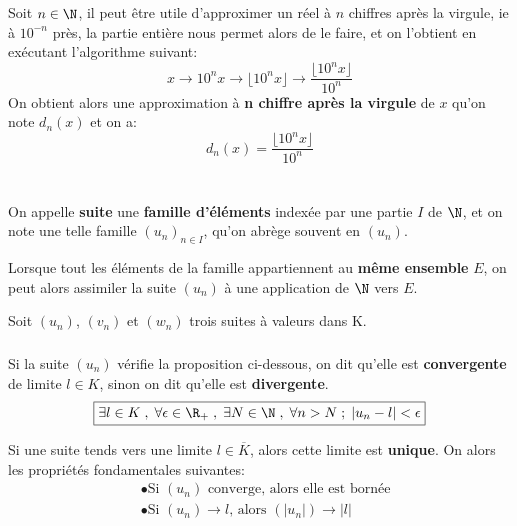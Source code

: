 \subsection*{}
Soit \(n \in \N\), il peut être utile d'approximer un réel à \(n\) chiffres après la virgule, ie à \(10^{-n}\) près, la partie entière nous permet alors de le faire, et on l'obtient en exécutant l'algorithme suivant:
\[
    x \rightarrow 10^n x \rightarrow \lfloor 10^n x \rfloor \rightarrow \frac{\lfloor 10^n x \rfloor}{10^n}
\]
On obtient alors une approximation à \textbf{n chiffre après la virgule} de \(x\) qu'on note \(d_n(x)\) et on a:
\[
    \boxed{
        d_n(x) = \frac{\lfloor 10^n x \rfloor}{10^n}
    }
\]

\chapter*{}
On appelle \textbf{suite} une \textbf{famille d'éléments} indexée par une partie \(I\) de \(\N\), et on note une telle famille \((u_n)_{n \in I}\), qu'on abrège souvent en \((u_n)\).\<

Lorsque tout les éléments de la famille appartiennent au \textbf{même ensemble} \(E\), on peut alors assimiler la suite \((u_n)\) à une application de \(\N\) vers \(E\).\<

Soit \((u_n)\), \((v_n)\) et \((w_n)\) trois suites à valeurs dans K.

\subsection*{}
Si la suite \((u_n)\) vérifie la proposition ci-dessous, on dit qu'elle est \textbf{convergente} de limite \(l \in K\), sinon on dit qu'elle est \textbf{divergente}.
\[
    \boxed{
        \exists l \in K \; , \; \forall \epsilon \in \R_+ \; , \; \exists N \in \N \; , \; \forall n > N \; ; \; |u_n - l| < \epsilon   
    }
\]

Si une suite tends vers une limite \(l \in \overline{K}\), alors cette limite est \textbf{unique}.\+
On alors les propriétés fondamentales suivantes:
\begin{align*}
    &\bullet \text{Si \((u_n)\) converge, alors elle est bornée}\\
    &\bullet \text{Si \((u_n) \rightarrow l\), alors \((|u_n|) \rightarrow |l|\)}
\end{align*}

